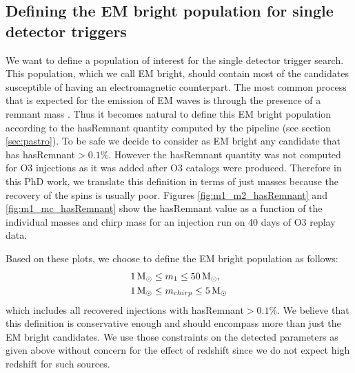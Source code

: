 \clearpage\newpage
\subsection{Defining the EM bright population for single detector triggers}
\label{sec:embright}

We want to define a population of interest for the single detector trigger search.
This population, which we call EM bright, should contain most of the candidates susceptible of having an electromagnetic counterpart.
The most common process that is expected for the emission of EM waves is through the presence of a remnant mass \cite{bright_remnant}.
Thus it becomes natural to define this EM bright population according to the hasRemnant quantity computed by the pipeline (see section \ref{sec:pastro}).
To be safe we decide to consider as EM bright any candidate that has hasRemnant$>0.1\%$.
However the hasRemnant quantity was not computed for O3 injections as it was added after O3 catalogs were produced.
Therefore in this PhD work, we translate this definition in terms of just masses because the recovery of the spins is usually poor.
Figures \ref{fig:m1_m2_hasRemnant} and \ref{fig:m1_mc_hasRemnant} show the hasRemnant value as a function of the individual masses and chirp mass for an injection run on 40 days of O3 replay data.

Based on these plots, we choose to define the EM bright population as follows:
% 
\begin{align}
  &\textrm{\SI{1}{\textrm{M$_{\odot}$}}} \leq m_1 \leq \textrm{\SI{50}{\textrm{M$_{\odot}$}}},\\
  &\textrm{\SI{1}{\textrm{M$_{\odot}$}}} \leq m_{chirp} \leq \textrm{\SI{5}{\textrm{M$_{\odot}$}}}
\end{align}
% 
which includes all recovered injections with hasRemnant$>0.1\%$.
We believe that this definition is conservative enough and should encompass more than just the EM bright candidates.
We use those constraints on the detected parameters as given above without concern for the effect of redshift since we do not expect high redshift for such sources.

